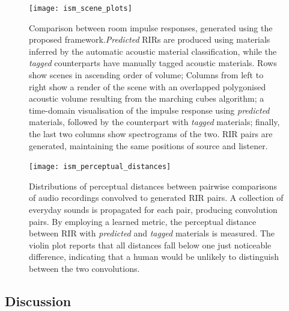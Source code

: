 \begin{figure}[htbp]
    \centering
    \texttt{[image: ism\_scene\_plots]}
    \caption{Comparison between room impulse responses, generated using the proposed framework.\emph{Predicted} RIRs are produced using materials inferred by the automatic acoustic material classification, while the \emph{tagged} counterparts have manually tagged acoustic materials. Rows show scenes in ascending order of volume; Columns from left to right show a render of the scene with an overlapped polygonised acoustic volume resulting from the marching cubes algorithm; a time-domain visualisation of the impulse response using \emph{predicted} materials, followed by the counterpart with \emph{tagged} materials; finally, the last two columns show spectrograms of the two. RIR pairs are generated, maintaining the same positions of source and listener.}
    \label{fig:ism_scene_plots}
\end{figure}

\begin{figure}[htbp]
 \centering %
 \texttt{[image: ism\_perceptual\_distances]}
 \caption{Distributions of perceptual distances between pairwise comparisons of audio recordings convolved to generated RIR pairs.
A collection of everyday sounds is propagated for each pair, producing convolution pairs. By employing a learned metric, the perceptual distance between RIR with \emph{predicted} and \emph{tagged} materials is measured. The violin plot reports that all distances fall below one just noticeable difference, indicating that a human would be unlikely to distinguish between the two convolutions.}
 \label{fig:ism_perceptual_evaluation}
\end{figure}

\subsection{Discussion}
